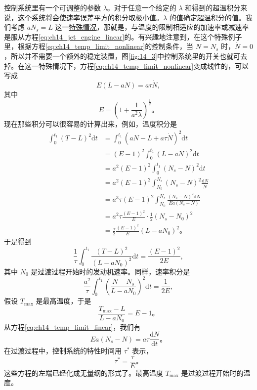 控制系统里有一个可调整的参数 $\lambda$。对于任意一个给定的 $\lambda$ 和得到的超温积分来说，这个系统将会使速率误差平方的积分取极小值。$\lambda$ 的值确定超温积分的值。我们考虑 $aN_s=L$ 这一\underline{特殊情况}，那就是，与温度的限制相适应的加速率或减速率是服从方程\eqref{eq:ch14_jet_engine_linear}的。有兴趣地注意到，在这个特殊例子里，根据方程\eqref{eq:ch14_temp_limit_nonlinear}的控制条件，当 $N=N_s$ 时，$\dot{N}=0$，所以并不需要一个额外的稳定装置，图\ref{fig:14_3}中控制系统里的开关也就可去掉。在这一特殊情况下，方程\eqref{eq:ch14_temp_limit_nonlinear}变成线性的，可以写成
\begin{equation}
E(L-aN) = a\tau\dot{N},
\label{eq:ch14_temp_limit_linear}
\end{equation}
其中
\begin{equation}
E = \left(1+\frac{1}{a^2\lambda}\right)^{\frac12}。
\label{eq:ch14_temp_limit_E_def}
\end{equation}
现在那些积分可以很容易的计算出来，例如，温度积分是
\begin{equation*}
\begin{aligned}
\int_{0}^{t_1} (T-L)^2\mathrm{d}t&=\int_{0}^{t_1} (aN-L+a\tau\dot{N})^2\mathrm{d}t \\
&=(E-1)^2\int_{0}^{t_1} (L-aN)^2\mathrm{d}t \\
&=a^2(E-1)^2\int_{0}^{t_1} (N_s-N)^2\mathrm{d}t \\
&=a^2(E-1)^2\int_{N_0}^{N_s} (N_s-N)^2\frac{\mathrm{d}N}{\dot{N}} \\
&=a^3\tau(E-1)^2\int_{N_0}^{N_s}\frac{(N_s-N)^2\mathrm{d}N}{Ea(N_s-N)} \\
&=a^2\tau\frac{(E-1)^2}{E}\cdot\frac12(N_s-N_0)^2 \\
&=\frac{\tau}{2}\frac{(E-1)^2}{E}(L-aN_0)^2。
\end{aligned}
\end{equation*}
于是得到
\begin{equation}
\frac{1}{\tau}\int_{0}^{t_1}\frac{(T-L)^2}{(L-aN_0)^2}\mathrm{d}t = \frac{(E-1)^2}{2E},
\label{eq:ch14_temp_integral_result}
\end{equation}
其中 $N_0$ 是过渡过程开始时的发动机速率。同样，速率积分是
\begin{equation}
\frac{a^2}{\tau}\int_{0}^{t_1}\left(\frac{N-N_s}{L-aN_0}\right)^2\mathrm{d}t = \frac{1}{2E},
\label{eq:ch14_speed_integral_result}
\end{equation}
假设 $T_\mathrm{max}$ 是最高温度，于是
\begin{equation}
\frac{T_\mathrm{max}-L}{L-aN_0} = E-1。
\label{eq:ch14_temp_max_relation}
\end{equation}
从方程\eqref{eq:ch14_temp_limit_linear}，我们有
\begin{equation*}
Ea(N_s-N) = a\tau\frac{\mathrm{d}N}{\mathrm{d}t}。
\end{equation*}
在过渡过程中，控制系统的特性时间用 $\tau^*$ 表示，
\begin{equation}
\tau^* = \frac{\tau}{E}。
\label{eq:ch14_char_time}
\end{equation}
这些方程的左端已经化成无量纲的形式了。最高温度 $T_\mathrm{max}$ 是过渡过程开始时的温度。


